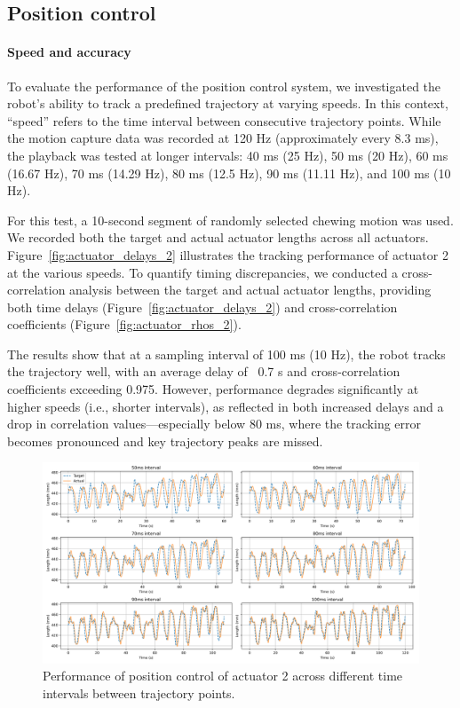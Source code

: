 \subsection{Position control}

\paragraph{Speed and accuracy}
To evaluate the performance of the position control system, we investigated the robot's ability to track a predefined trajectory at varying speeds. 
In this context, “speed” refers to the time interval between consecutive trajectory points. While the motion capture data was recorded at 120 Hz 
(approximately every 8.3 ms), the playback was tested at longer intervals: 40 ms (25 Hz), 50 ms (20 Hz), 60 ms (16.67 Hz), 70 ms (14.29 Hz), 80 ms 
(12.5 Hz), 90 ms (11.11 Hz), and 100 ms (10 Hz).

For this test, a 10-second segment of randomly selected chewing motion was used. We recorded both the target and actual actuator lengths across all 
actuators. Figure~\ref{fig:actuator_delays_2} illustrates the tracking performance of actuator 2 at the various speeds. To quantify timing discrepancies, we 
conducted a cross-correlation analysis between the target and actual actuator lengths, providing both time delays (Figure~\ref{fig:actuator_delays_2}) 
and cross-correlation coefficients (Figure~\ref{fig:actuator_rhos_2}).

The results show that at a sampling interval of 100 ms (10 Hz), the robot tracks the trajectory well, with an average delay of ~0.7 s and 
cross-correlation coefficients exceeding 0.975. However, performance degrades significantly at higher speeds (i.e., shorter intervals), 
as reflected in both increased delays and a drop in correlation values—especially below 80 ms, where the tracking error becomes pronounced 
and key trajectory peaks are missed.

\begin{figure}[H]
    \centering
    \includegraphics[width=\textwidth]{figures/actuator_2_trajectories.png}
    \caption{Performance of position control of actuator 2 across different time intervals between trajectory points.}
    \label{fig:position_control}
\end{figure}

